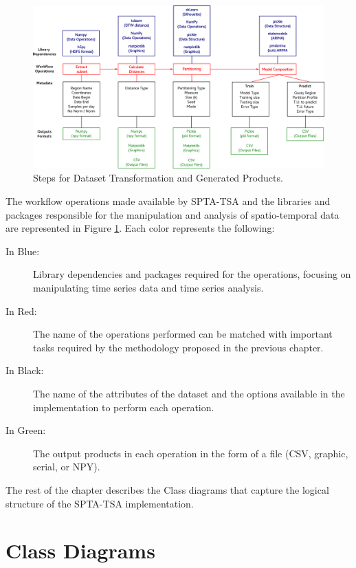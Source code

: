 \begin{figure}[tp]
	\centering
	\includegraphics[scale=0.25, angle=90]{../Figures/workflow_data_operations}
	\caption{Steps for Dataset Transformation and Generated Products.}	
	\label{Fig:Steps-Data-Transformation}	 		
\end{figure}

The workflow operations made available by SPTA-TSA and the libraries and packages responsible for the manipulation and analysis of spatio-temporal data are represented in Figure \ref{Fig:Steps-Data-Transformation}. Each color represents the following:

\begin{description}
    \item[In Blue:] Library dependencies and packages required for the operations, focusing on manipulating time series data and time series analysis.
    \item[In Red:] The name of the operations performed can be matched with important tasks required by the methodology proposed in the previous chapter.
    \item[In Black:] The name of the attributes of the dataset and the options available in the implementation to perform each operation.
    \item[In Green:] The output products in each operation in the form of a file (CSV, graphic, serial, or NPY).
\end{description}

The rest of the chapter describes the Class diagrams that capture the logical structure of the SPTA-TSA implementation.

\section{Class Diagrams}
\label{Sec:SPT-TSAClassDiagrams}


